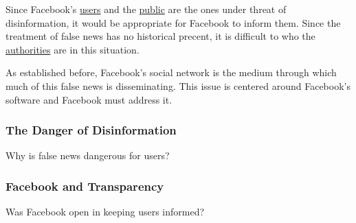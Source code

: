 \par Since Facebook's \ul{users} and the \ul{public} are the ones under threat of disinformation, it would be appropriate for Facebook to inform them. Since the treatment of false news has no historical precent, it is difficult to who the \ul{authorities} are in this situation.

\par As established before, Facebook's social network is the medium through which much of this false news is disseminating. This issue is centered around Facebook's software and Facebook must address it.


\subsubsection{The Danger of Disinformation}

\par Why is false news dangerous for users?

\subsubsection{Facebook and Transparency}

\par Was Facebook open in keeping users informed?
